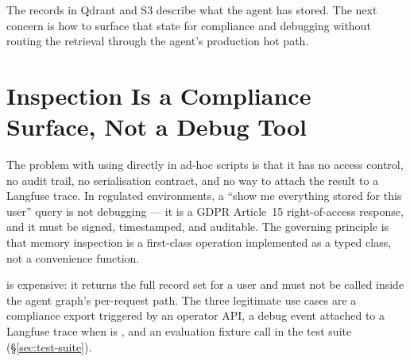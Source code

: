 The records in Qdrant and S3 describe what the agent has stored. The next
concern is how to surface that state for compliance and debugging without
routing the retrieval through the agent's production hot path.

\section{Inspection Is a Compliance Surface, Not a Debug Tool}
\label{sec:memory-inspection}

The problem with using  directly in ad-hoc scripts is that
it has no access control, no audit trail, no serialisation contract, and no
way to attach the result to a Langfuse trace. In regulated environments, a
``show me everything stored for this user'' query is not debugging --- it is a
GDPR Article~15 right-of-access response, and it must be signed, timestamped,
and auditable. The governing principle is that memory inspection is a
first-class operation implemented as a typed class, not a convenience function.

 is expensive: it returns the full record set
for a user and must not be called inside the agent graph's per-request path.
The three legitimate use cases are a compliance export triggered by an operator
API, a debug event attached to a Langfuse trace when 
is , and an evaluation fixture call in the test suite
(\S\ref{sec:test-suite}).

